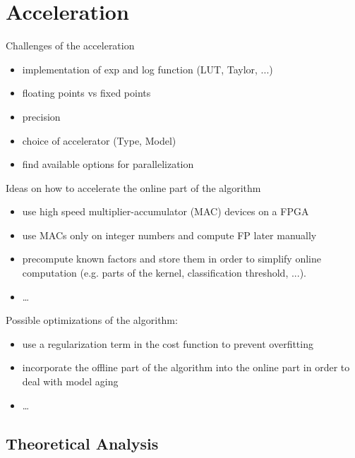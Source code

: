 \documentclass[mscthesis]{usiinfthesis}
\begin{document}
\chapter{Acceleration}
\label{ch:acc}

Challenges of the acceleration
\begin{itemize}
    \item implementation of exp and log function (LUT, Taylor, ...)
    \item floating points vs fixed points
    \item precision
    \item choice of accelerator (Type, Model)
    \item find available options for parallelization
\end{itemize}

Ideas on how to accelerate the online part of the algorithm
\begin{itemize}
    \item use high speed multiplier-accumulator (MAC) devices on a FPGA
    \item use MACs only on integer numbers and compute FP later manually
    \item precompute known factors and store them in order to simplify online
        computation (e.g. parts of the kernel, classification threshold, ...).
    \item \dots
\end{itemize}

Possible optimizations of the algorithm:
\begin{itemize}
    \item use a regularization term in the cost function to prevent overfitting
    \item incorporate the offline part of the algorithm into the online part in
        order to deal with model aging
    \item \dots
\end{itemize}

\section{Theoretical Analysis}
\label{ch:acc_theo}
\end{document}
